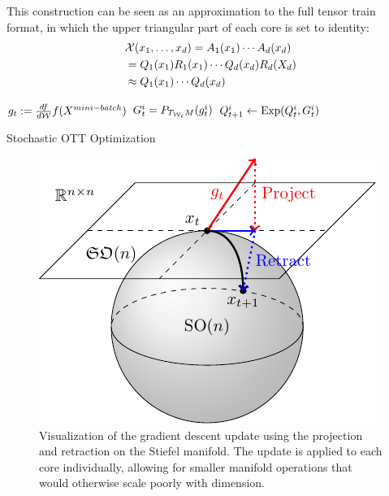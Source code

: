 This construction can be seen as an approximation to the full tensor train format, in which the upper triangular part of each core is set to identity:
\begin{align*}
&\cX(x_1,\ldots,x_d) = A_1(x_1)\cdots A_d(x_d) \\ &= Q_1(x_1)R_1(x_1)\cdots Q_d(x_d)R_d(X_d) \\
&\approx Q_1(x_1) \cdots Q_d(x_d) %
\end{align*}

\begin{algorithm}[H]
	\begin{algorithmic}
		\State $g_t := \frac{df}{d\mathcal{W}} f(X^{mini-batch})$
		\State $G^i_t = P_{T_{\mathcal{W}_t}M}(g^i_t)$ 
		\State $Q^i_{t+1} \leftarrow \text{Exp}(Q^i_t, G^i_t)$ 
		\EndFor
		\EndFor
	\end{algorithmic}
	\caption*{\footnotesize Stochastic OTT Optimization}
\end{algorithm}

\begin{figure}
	\centering
	\includegraphics[width=0.5\columnwidth,trim={0 1.5cm 0 0},clip]{chap3/stiefel_update.pdf}
	\caption{\footnotesize Visualization of the gradient descent update using the projection and retraction on the Stiefel manifold. The update is applied to each core individually, allowing for smaller manifold operations that would otherwise scale poorly with dimension.}
\end{figure}


